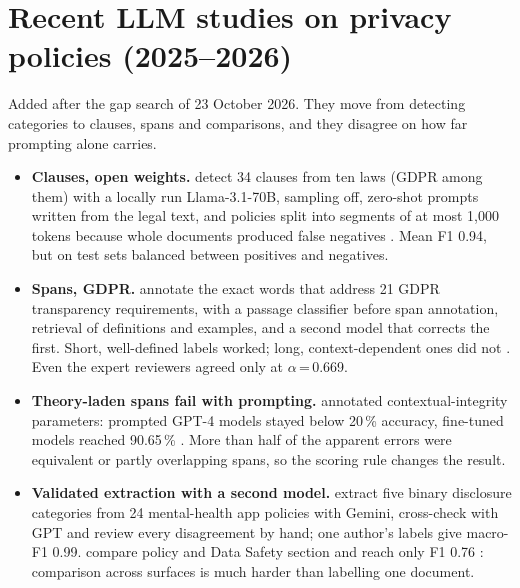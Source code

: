 \section{Recent LLM studies on privacy policies (2025--2026)}
Added after the gap search of 23 October 2026. They move from detecting categories to clauses, spans and comparisons, and they disagree on how far prompting alone carries.
\begin{itemize}
\item \textbf{Clauses, open weights.}  detect 34 clauses from ten laws (GDPR among them) with a locally run Llama-3.1-70B, sampling off, zero-shot prompts written from the legal text, and policies split into segments of at most 1,000 tokens because whole documents produced false negatives . Mean F1 0.94, but on test sets balanced between positives and negatives.
\item \textbf{Spans, GDPR.}  annotate the exact words that address 21 GDPR transparency requirements, with a passage classifier before span annotation, retrieval of definitions and examples, and a second model that corrects the first. Short, well-defined labels worked; long, context-dependent ones did not . Even the expert reviewers agreed only at $\alpha$\,=\,0.669.
\item \textbf{Theory-laden spans fail with prompting.}  annotated contextual-integrity parameters: prompted GPT-4 models stayed below 20\,\% accuracy, fine-tuned models reached 90.65\,\% . More than half of the apparent errors were equivalent or partly overlapping spans, so the scoring rule changes the result.
\item \textbf{Validated extraction with a second model.}  extract five binary disclosure categories from 24 mental-health app policies with Gemini, cross-check with GPT and review every disagreement by hand; one author's labels give macro-F1 0.99.  compare policy and Data Safety section and reach only F1 0.76 : comparison across surfaces is much harder than labelling one document.

\end{itemize}
